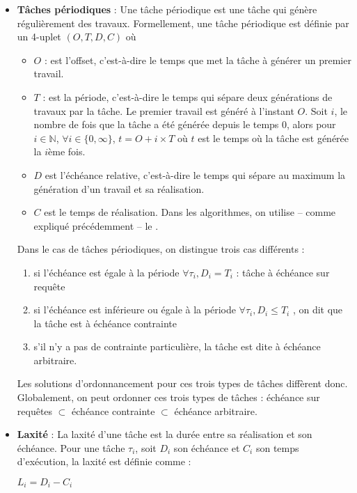 \begin{itemize}
		\item \textbf{Tâches périodiques} :
		Une tâche périodique est une tâche qui génère régulièrement des travaux.  
		Formellement, une tâche périodique est définie par un 4-uplet $(O, T, D, C)$ où \medskip
		\begin{itemize}
			\item \textbf{$O$} : est l'\og offset\fg{}\label{offset}, c'est-à-dire le temps que met la tâche à générer un premier travail.
			\item \textbf{$T$} : est la période, c'est-à-dire le temps qui sépare deux générations de travaux par la tâche. 
			Le premier travail est généré à l'instant $O$. Soit $i$, le nombre de fois que la tâche a été générée depuis le temps $0$,			
			 alors pour $i \in \mathbb{N}$, $\forall i \in \{0, \infty \}$,  $t = O + i\times T$ 
			où $t$ est le temps où la tâche est générée la $i$ème fois.
			\item \textbf{$D$} est l'échéance relative, c'est-à-dire le temps qui sépare au maximum la génération 
			d'un travail et sa réalisation.
			\item \textbf{$C$} est le temps de réalisation. Dans les algorithmes, on utilise -- comme expliqué précédemment -- le .
		\end{itemize}	
		Dans le cas de tâches périodiques, on distingue trois cas différents : \medskip
		\begin{enumerate}
			\item si l'échéance est égale à la période $\forall \tau_i, D_i = T_i$ : tâche à \label{echeancesurrequete}échéance sur requête
			\item si l'échéance est inférieure ou égale à la période $\forall \tau_i, D_i \leq T_i $ , on dit que la tâche est à \label{echeancecontrainte} échéance contrainte
			\item s'il n'y a pas de contrainte particulière, la tâche est dite \og à échéance arbitraire\fg{}\label{echeancearbitraire}.
		\end{enumerate}
		Les solutions d'ordonnancement pour ces trois types de tâches diffèrent donc. 
		Globalement, on peut ordonner ces trois types de tâches : \medskip
		échéance sur requêtes $\subset$ échéance contrainte $\subset$ échéance arbitraire.
		
		\item \textbf{Laxité} : La laxité d'une tâche est la durée entre sa réalisation et son échéance. 
		Pour une tâche $\tau_i$, soit $D_i$ son échéance et $C_i$ son temps d'exécution, la laxité est définie comme :
		\vspace{-0.5cm}
		\begin{center}
			$L_i = D_i - C_i$
		\end{center}
		

\end{itemize}

